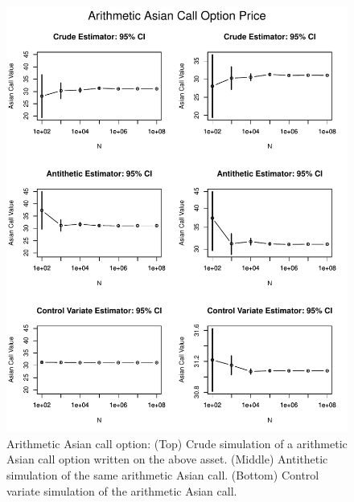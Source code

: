 \documentclass[12pt]{article}
\begin{document}
\begin{figure}[H]
	\centering
 	\includegraphics[scale=1]{../plots/q3/ari_asian_call_sim_est.pdf}
\caption{Arithmetic Asian call option: (Top) Crude simulation of a arithmetic Asian call option written on the above asset. (Middle) Antithetic simulation of the same arithmetic Asian call. (Bottom) Control variate simulation of the arithmetic Asian call.}
\label{fig:ari_asian_call_sim_est}
\end{figure}
\end{document}
